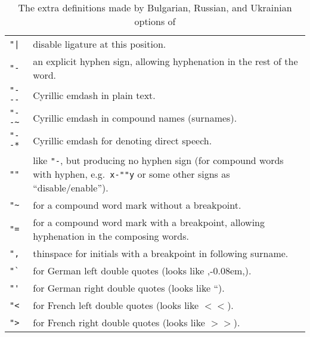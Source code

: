 \begin{table}[htb]
  \begin{center}
  \caption[Bulgarian, Russian, and Ukrainian]{The extra definitions made
           by Bulgarian, Russian, and Ukrainian options of }\label{Cyrillic}
  \begin{tabular}{@{}p{.1\hsize}@{}p{.9\hsize}@{}}
   \hline
   \verb="|= & disable ligature at this position.               \\
   \verb|"-| & an explicit hyphen sign, allowing hyphenation
               in the rest of the word.                         \\
   \verb|"---| & Cyrillic emdash in plain text.                      \\
   \verb|"--~| & Cyrillic emdash in compound names (surnames).       \\
   \verb|"--*| & Cyrillic emdash for denoting direct speech.         \\
   \verb|""| & like \verb|"-|, but producing no hyphen sign
               (for compound words with hyphen, e.g.\ \verb|x-""y|
               or some other signs  as ``disable/enable'').     \\
   \verb|"~| & for a compound word mark without a breakpoint.        \\
   \verb|"=| & for a compound word mark with a breakpoint, allowing
          hyphenation in the composing words.                   \\
   \verb|",| & thinspace for initials with a breakpoint
           in following surname.                                \\
   \verb|"`| & for German left double quotes
               (looks like ,\kern-0.08em,).                     \\
   \verb|"'| & for German right double quotes (looks like ``).       \\%
   \verb|"<| & for French left double quotes (looks like $<\!\!<$).  \\
   \verb|">| & for French right double quotes (looks like $>\!\!>$). \\
   \hline
  \end{tabular}
  \end{center}
\end{table}


